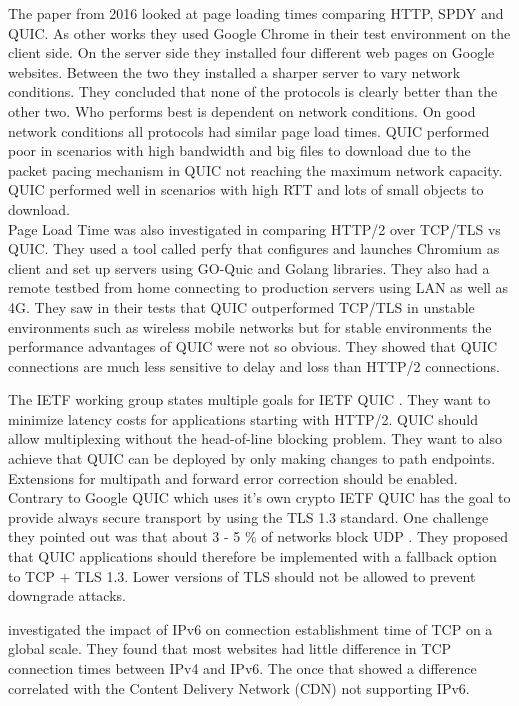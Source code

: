 The paper \cite{DBLP:conf/icc/MegyesiKM16} from 2016 looked at page loading times comparing HTTP, SPDY and QUIC.
As other works they used Google Chrome in their test environment on the client side.
On the server side they installed four different web pages on Google websites.
Between the two they installed a sharper server to vary network conditions. 
They concluded that none of the protocols is clearly better than the other two.
Who performs best is dependent on network conditions.
On good network conditions all protocols had similar page load times.
QUIC performed poor in scenarios with high bandwidth and big files to download due to the packet pacing mechanism in QUIC not reaching the maximum network capacity.
QUIC performed well in scenarios with high RTT and lots of small objects to download. 
\\
Page Load Time was also investigated in \cite{DBLP:conf/icc/CookMTH17} comparing HTTP/2 over TCP/TLS vs QUIC.
They used a tool called perfy that configures and launches Chromium as client and set up servers using GO-Quic and Golang libraries.
They also had a remote testbed from home connecting to production servers using LAN as well as 4G.
They saw in their tests that QUIC outperformed TCP/TLS in unstable environments such as wireless mobile networks but for stable environments the performance advantages of QUIC were not so obvious. 
They showed that QUIC connections are much less sensitive to delay and loss than HTTP/2 connections.


The IETF working group states multiple goals for IETF QUIC \cite{Link:ietfQuic}.
They want to minimize latency costs for applications starting with HTTP/2.
QUIC should allow multiplexing without the head-of-line blocking problem.
They want to also achieve that QUIC can be deployed by only making changes to path endpoints.
Extensions for multipath and forward error correction should be enabled.
Contrary to Google QUIC which uses it's own crypto IETF QUIC has the goal to provide always secure transport by using the TLS 1.3 standard.
One challenge they pointed out was that about 3 - 5 \% of networks block UDP \cite{Link:IETFQUICApplicability}.
They proposed that QUIC applications should therefore be implemented with a fallback option to TCP + TLS 1.3. 
Lower versions of TLS should not be allowed to prevent downgrade attacks.

\cite{DBLP:conf/networking/BajpaiS15} investigated the impact of IPv6 on connection establishment time of TCP on a global scale.
They found that most websites had little difference in TCP connection times between IPv4 and IPv6. The once that showed a difference correlated with the Content Delivery Network (CDN) not supporting IPv6.